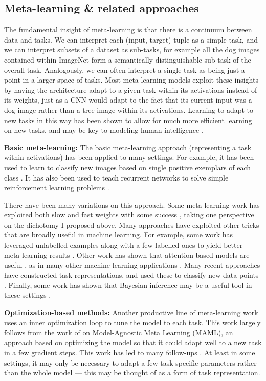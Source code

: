 \subsection{Meta-learning \& related approaches} \label{meta_learning_sec}

The fundamental insight of meta-learning is that there is a continuum between data and tasks. We can interpret each (input, target) tuple as a simple task, and we can interpret subsets of a dataset as sub-tasks, for example all the dog images contained within ImageNet form a semantically distinguishable sub-task of the overall task. Analogously, we can often interpret a single task as being just a point in a larger space of tasks. Most meta-learning models exploit these insights by having the architecture adapt to a given task within its activations instead of its weights, just as a CNN would adapt to the fact that its current input was a dog image rather than a tree image within its activations. Learning to adapt to new tasks in this way has been shown to allow for much more efficient learning on new tasks, and may be key to modeling human intelligence \citep{Hansen2017}. \par 
\textbf{Basic meta-learning:}
The basic meta-learning approach (representing a task within activations) has been applied to many settings. For example, it has been used to learn to classify new images based on single positive exemplars of each class \citep{Vinyals2016, Ravi2017}. It has also been used to teach recurrent networks to solve simple reinforcement learning problems \citep{Duan2016, Wang2016a, Stadie2018}. \par
There have been many variations on this approach. Some meta-learning work has exploited both slow and fast weights with some success \citep[e.g.][]{Munkhdalai2017}, taking one perspective on the dichotomy I proposed above. Many approaches have exploited other tricks that are broadly useful in machine learning. For example, some work has leveraged unlabelled examples along with a few labelled ones to yield better meta-learning results \citep[e.g.][]{Ren2018}. Other work has shown that attention-based models are useful \citep{Reed2017}, as in many other machine-learning applications \citep[e.g.][]{Vaswani, Gregor2015}. Many recent approaches have constructed task representations, and used these to classify new data points \citep{Li2019a,Ravichandran2019}. Finally, some work has shown that Bayesian inference may be a useful tool in these settings \citep{Burgess2016}. \par
\textbf{Optimization-based methods:} Another productive line of meta-learning work uses an inner optimization loop to tune the model to each task. This work largely follows from the work of \citet{Finn2017a} on Model-Agnostic Meta Learning (MAML), an approach based on optimizing the model so that it could adapt well to a new task in a few gradient steps. This work has led to many follow-ups \citep[e.g.][]{Finn2017, Finn2018, Nichol2018}. At least in some settings, it may only be necessary to adapt a few task-specific parameters rather than the whole model \citep{Zintgraf2018} --- this may be thought of as a form of task representation. \par

